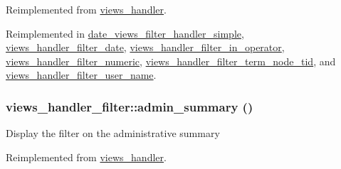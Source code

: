 Reimplemented from \hyperlink{classviews__handler_a20433153babc3196b26ee773755a709e}{views\_\-handler}.

Reimplemented in \hyperlink{classdate__views__filter__handler__simple_af129fdbfc4ec0a307289b09e25bd5190}{date\_\-views\_\-filter\_\-handler\_\-simple}, \hyperlink{classviews__handler__filter__date_a063da758bf1832f38454620cbc94e304}{views\_\-handler\_\-filter\_\-date}, \hyperlink{classviews__handler__filter__in__operator_aff2b25941729b9ca81e1e53bb8e95a96}{views\_\-handler\_\-filter\_\-in\_\-operator}, \hyperlink{classviews__handler__filter__numeric_a0fd6abb3062be32410bef3c1cefdaaf5}{views\_\-handler\_\-filter\_\-numeric}, \hyperlink{classviews__handler__filter__term__node__tid_a75f38674ff356981f6e77f009da2101a}{views\_\-handler\_\-filter\_\-term\_\-node\_\-tid}, and \hyperlink{classviews__handler__filter__user__name_aa6ae18031b13da1c92d83b8c5de74c15}{views\_\-handler\_\-filter\_\-user\_\-name}.\hypertarget{classviews__handler__filter_a655263cd0b73188eec064b9a9743fe4c}{
\subsubsection[{admin\_\-summary}]{\setlength{\rightskip}{0pt plus 5cm}views\_\-handler\_\-filter::admin\_\-summary ()}}
\label{classviews__handler__filter_a655263cd0b73188eec064b9a9743fe4c}
Display the filter on the administrative summary 

Reimplemented from \hyperlink{classviews__handler_a27a5cb35f3f17322957730a95b6be11e}{views\_\-handler}.

